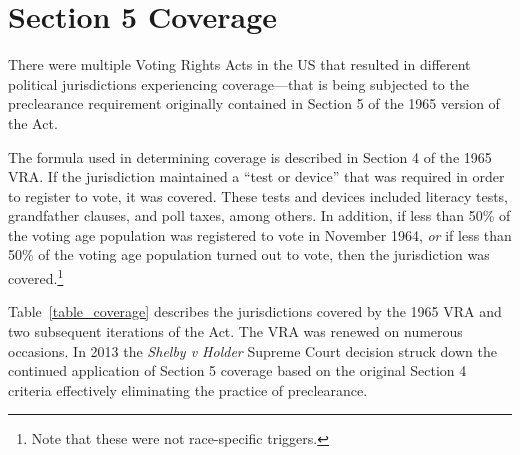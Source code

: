 \documentclass[12pt]{article}
\begin{document}
\clearpage \newpage
\section{Section 5 Coverage}\label{appendix_coverage}
\setcounter{table}{0}
\setcounter{figure}{0}
\renewcommand{\thetable}{B\arabic{table}}
\renewcommand{\thefigure}{B\arabic{figure}}
\normalsize

There were multiple Voting Rights Acts in the US that resulted in different political jurisdictions experiencing coverage---that is being subjected to the preclearance requirement originally contained in Section 5 of the 1965 version of the Act.

The formula used in determining coverage is described in Section 4 of the 1965 VRA.  If the jurisdiction maintained a ``test or device'' that was required in order to register to vote, it was covered.  These tests and devices included literacy tests, grandfather clauses, and poll taxes, among others.  In addition, if less than 50\% of the voting age population was registered to vote in November 1964, \emph{or} if less than 50\% of the voting age population turned out to vote, then the jurisdiction was covered.\footnote{Note that these were not race-specific triggers.}

Table~\ref{table_coverage} describes the jurisdictions covered by the 1965 VRA and two subsequent iterations of the Act.  The VRA was renewed on numerous occasions.  In 2013 the \emph{Shelby v Holder} Supreme Court decision struck down the continued application of Section 5 coverage based on the original Section 4 criteria effectively eliminating the practice of preclearance.
\end{document}
